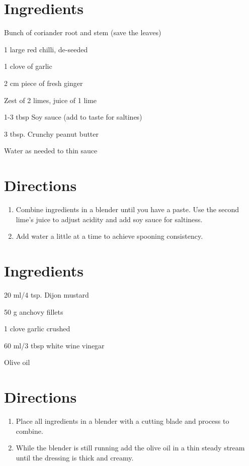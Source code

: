 
\section*{Ingredients}
\begin{ingredients-list}
	\item Bunch of coriander root and stem (save the leaves)
	\item 1 large red chilli, de-seeded
	\item 1 clove of garlic
	\item 2 cm piece of fresh ginger
	\item Zest of 2 limes, juice of 1 lime
	\item 1-3 tbsp Soy sauce (add to taste for saltines)
	\item 3 tbsp. Crunchy peanut butter
	\item Water as needed to thin sauce
\end{ingredients-list}
\section*{Directions}
\begin{enumerate}
	\item Combine ingredients in a blender until you have a paste. Use the second lime’s juice to adjust acidity and add soy sauce for saltiness.
	\item Add water a little at a time to achieve spooning consistency.
\end{enumerate}

\label{salad_nicoise}
\hypertarget{salad_nicoise}{}

\section*{Ingredients}
\begin{ingredients-list}
	\item 20 ml/4 tsp. Dijon mustard
	\item 50 g anchovy fillets
	\item 1 clove garlic crushed
	\item 60 ml/3 tbsp white wine vinegar
	\item Olive oil
\end{ingredients-list}
\section*{Directions}
\begin{enumerate}
	\item Place all ingredients in a blender with a cutting blade and process to combine.
	\item While the blender is still running add the olive oil in a thin steady stream until the dressing is	thick and creamy.
\end{enumerate}


